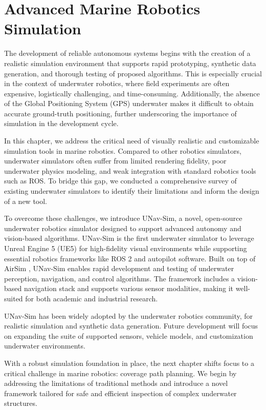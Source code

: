 \chapter{Advanced Marine Robotics Simulation}

The development of reliable autonomous systems begins with the creation of a realistic simulation environment that supports rapid prototyping, synthetic data generation, and thorough testing of proposed algorithms. This is especially crucial in the context of underwater robotics, where field experiments are often expensive, logistically challenging, and time-consuming. Additionally, the absence of the Global Positioning System (GPS) underwater makes it difficult to obtain accurate ground-truth positioning, further underscoring the importance of simulation in the development cycle.


In this chapter, we address the critical need of visually realistic and customizable simulation tools in marine robotics. Compared to other robotics simulators, underwater simulators often suffer from limited rendering fidelity, poor underwater physics modeling, and weak integration with standard robotics tools such as ROS. To bridge this gap, we conducted a comprehensive survey of existing underwater simulators to identify their limitations and inform the design of a new tool.

To overcome these challenges, we introduce UNav-Sim, a novel, open-source underwater robotics simulator designed to support advanced autonomy and vision-based algorithms. UNav-Sim is the first underwater simulator to leverage Unreal Engine 5 (UE5) \cite{unreal} for high-fidelity visual environments while supporting essential robotics frameworks like ROS 2 and autopilot software. Built on top of AirSim \cite{airsim}, UNav-Sim enables rapid development and testing of underwater perception, navigation, and control algorithms. The framework includes a vision-based navigation stack and supports various sensor modalities, making it well-suited for both academic and industrial research.

UNav-Sim has been widely adopted by the underwater robotics community, for realistic simulation and synthetic data generation. Future development will focus on expanding the suite of supported sensors, vehicle models, and customization underwater environments. 

With a robust simulation foundation in place, the next chapter shifts focus to a critical challenge in marine robotics: coverage path planning. We begin by addressing the limitations of traditional methods and introduce a novel framework tailored for safe and efficient inspection of complex underwater structures.